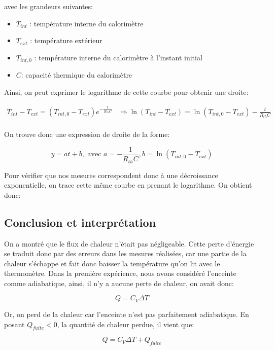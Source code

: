 \documentclass[12pt]{article}
\begin{document}
avec les grandeurs suivantes:
\begin{itemize}
	\item $T_{int}$ : température interne du calorimètre
	\item $T_{ext}$ : température extérieur
	\item $T_{int, 0}$ : température interne du calorimètre à l'instant initial
	\item $C$: capacité thermique du calorimètre
\end{itemize}

Ainsi, on peut exprimer le logarithme de cette courbe pour obtenir une droite:

\begin{align*}
	T_{int} - T_{ext} = (T_{int, 0} - T_{ext}) e^{- \frac{t}{R_{th}C}} & \Rightarrow \ln(T_{int} - T_{ext}) = \ln(T_{int, 0} - T_{ext}) - \frac{t}{R_{th}C} \\
\end{align*}

On trouve donc une expression de droite de la forme:

\begin{equation}
	y = at + b, \text{ avec } a = - \frac{1}{R_{th}C}, b = \ln(T_{int, 0} - T_{ext})
\end{equation}

Pour vérifier que nos mesures correspondent donc à une décroissance exponentielle, on trace cette même courbe en prenant le logarithme. On obtient donc:

\subsection{Conclusion et interprétation}
On a montré que le flux de chaleur n'était pas négligeable. Cette perte d'énergie se traduit donc par des erreurs dans les mesures réalisées, car une partie de la chaleur s'échappe et fait donc baisser la température qu'on lit
avec le thermomètre. Dans la première expérience, nous avons considéré l'enceinte comme adiabatique, ainsi, il n'y a aucune perte de chaleur, on avait donc:

\begin{equation}
	Q = C_V \Delta T
\end{equation}

Or, on perd de la chaleur car l'enceinte n'est pas parfaitement adiabatique. En posant $Q_{fuite} < 0$, la quantité de chaleur perdue, il vient que:

\begin{equation}
	Q = C_V \Delta T + Q_{fuite}
\end{equation}
\end{document}
